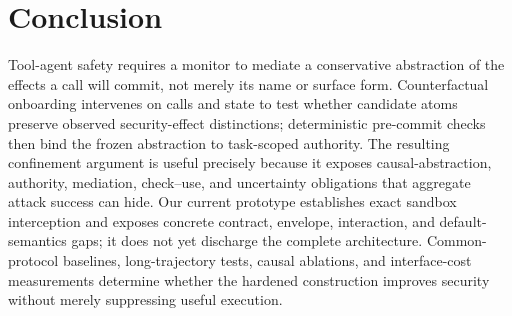 \section{Conclusion}

Tool-agent safety requires a monitor to mediate a conservative abstraction of the effects a call will commit, not merely its name or surface form. Counterfactual onboarding intervenes on calls and state to test whether candidate atoms preserve observed security-effect distinctions; deterministic pre-commit checks then bind the frozen abstraction to task-scoped authority. The resulting confinement argument is useful precisely because it exposes causal-abstraction, authority, mediation, check--use, and uncertainty obligations that aggregate attack success can hide. Our current prototype establishes exact sandbox interception and exposes concrete contract, envelope, interaction, and default-semantics gaps; it does not yet discharge the complete architecture. Common-protocol baselines, long-trajectory tests, causal ablations, and interface-cost measurements determine whether the hardened construction improves security without merely suppressing useful execution.
